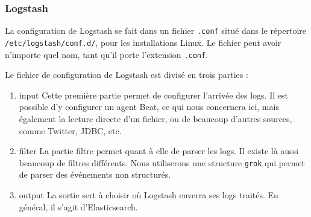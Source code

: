 \documentclass[paper=a4, fontsize=11pt]{scrartcl}
\begin{document}
\subsubsection{Logstash}
La configuration de Logstash se fait dans un fichier \verb,.conf, situé dans le répertoire \verb,/etc/logstash/conf.d/,, pour les installations Linux. Le fichier peut avoir n'importe quel nom, tant qu'il porte l'extension \verb,.conf,.

Le fichier de configuration de Logstash est divisé en trois parties :
\begin{enumerate}
    \item input
    \subitem Cette première partie permet de configurer l'arrivée des logs. Il est possible d'y configurer un agent Beat, ce qui nous concernera ici, mais également la lecture directe d'un fichier, ou de beaucoup d'autres sources, comme Twitter, JDBC, etc.
    \item filter
    \subitem La partie filtre permet quant à elle de parser les logs. Il existe là aussi beaucoup de filtres différents. Nous utiliserons une structure \verb,grok, qui permet de parser des événements non structurés.
    \item output
    \subitem La sortie sert à choisir où Logstash enverra ses logs traités. En général, il s'agit d'Elasticsearch.
\end{enumerate}
\end{document}
